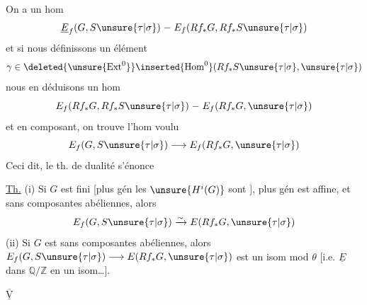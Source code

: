 On a un hom 
\[
\underline E_f(G,S\unsure{\tau|\sigma})\mathrel{-}E_f(Rf_*G,Rf_*S\unsure{\tau|\sigma})
\]
et si nous définissons un élément
\[
\gamma\in\deleted{\unsure{\operatorname{Ext}^0}}\inserted{\operatorname{Hom}^0}(Rf_*S\unsure{\tau|\sigma},\unsure{\tau|\sigma})
\]
nous en déduisons un  hom
\[
E_f(Rf_*G,Rf_*S\unsure{\tau|\sigma})\mathrel{-}E_f(Rf_*G,\unsure{\tau|\sigma})
\]
et en composant, on trouve l'hom voulu
\[
E_f(G,S\unsure{\tau|\sigma})\longrightarrow E_f(Rf_*G,\unsure{\tau|\sigma})
\]
Ceci dit, le th. de dualité s'énonce

\uline{Th.} (i) Si $G$ est  fini [plus gén les $\unsure{H^i(G)}$ sont ],  plus gén est affine, et sans composantes abéliennes, alors
\[
E_f(G,S\unsure{\tau|\sigma})\xrightarrow{\sim}E(Rf_*G,\unsure{\tau|\sigma})
\]
(ii) Si $G$ est  sans composantes abéliennes, alors $E_f(G,S\unsure{\tau|\sigma})\longrightarrow E(Rf_*G,\unsure{\tau|\sigma})$ est un isom mod $\theta$ [i.e.  $\underline E$ dans $\mathbb Q/\mathbb Z$   en un isom\ldots].

$\underline{\overline{\mathrm V}}$\quad{}
\begin{flushright}

\end{flushright}

